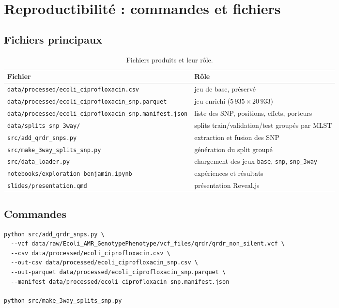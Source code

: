 \documentclass[11pt,a4paper]{article}
\begin{document}
\section{Reproductibilité : commandes et fichiers}

\subsection{Fichiers principaux}

\begin{table}[H]
\centering
\caption{Fichiers produits et leur rôle.}
\begin{tabularx}{\textwidth}{lX}
\toprule
\textbf{Fichier} & \textbf{Rôle} \\
\midrule
\texttt{data/processed/ecoli\_ciprofloxacin.csv} & jeu de base, préservé \\
\texttt{data/processed/ecoli\_ciprofloxacin\_snp.parquet} & jeu enrichi ($5\,935 \times 20\,933$) \\
\texttt{data/processed/ecoli\_ciprofloxacin\_snp.manifest.json} & liste des SNP, positions, effets, porteurs \\
\texttt{data/splits\_snp\_3way/} & splits train/validation/test groupés par MLST \\
\texttt{src/add\_qrdr\_snps.py} & extraction et fusion des SNP \\
\texttt{src/make\_3way\_splits\_snp.py} & génération du split groupé \\
\texttt{src/data\_loader.py} & chargement des jeux \texttt{base}, \texttt{snp}, \texttt{snp\_3way} \\
\texttt{notebooks/exploration\_benjamin.ipynb} & expériences et résultats \\
\texttt{slides/presentation.qmd} & présentation Reveal.js \\
\bottomrule
\end{tabularx}
\end{table}

\subsection{Commandes}

{\footnotesize
\begin{verbatim}
python src/add_qrdr_snps.py \
  --vcf data/raw/Ecoli_AMR_GenotypePhenotype/vcf_files/qrdr/qrdr_non_silent.vcf \
  --csv data/processed/ecoli_ciprofloxacin.csv \
  --out-csv data/processed/ecoli_ciprofloxacin_snp.csv \
  --out-parquet data/processed/ecoli_ciprofloxacin_snp.parquet \
  --manifest data/processed/ecoli_ciprofloxacin_snp.manifest.json

python src/make_3way_splits_snp.py
\end{verbatim}
}
\end{document}
